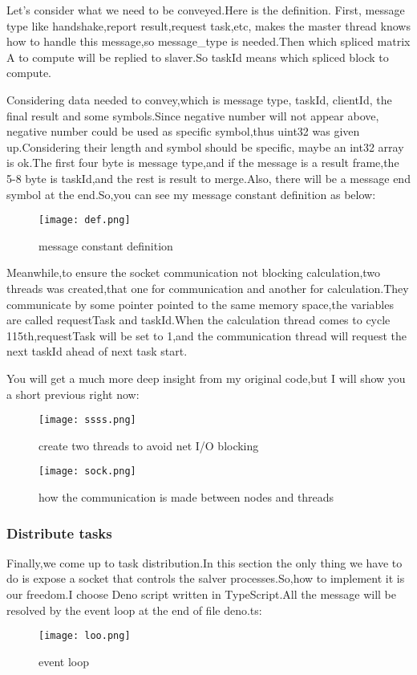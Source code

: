 \documentclass[12pt]{scrartcl} %
\begin{document}
Let's consider what we need to be conveyed.Here is the definition. First, message type like handshake,report result,request task,etc, makes the master thread knows how to handle this message,so message\_type is needed.Then which spliced matrix A to compute will be replied to slaver.So taskId means which spliced block to compute.

Considering data needed to convey,which is message type, taskId, clientId, the final result and some symbols.Since negative number will not appear above, negative number could be used as specific symbol,thus uint32 was given up.Considering their length and symbol should be specific, maybe an int32 array is ok.The first four byte is message type,and if the message is a result frame,the 5-8 byte is taskId,and the rest is result to merge.Also, there will be a message end symbol at the end.So,you can see my message constant definition as below:
\begin{figure}[H]
    \centering
    \texttt{[image: def.png]}
    \caption{message constant definition}
    \label{}
\end{figure}

Meanwhile,to ensure the socket communication not blocking calculation,two threads was created,that one for communication and another for calculation.They communicate by some pointer pointed to the same memory space,the variables are called requestTask and taskId.When the calculation thread comes to cycle 115th,requestTask will be set to 1,and the communication thread will request the next taskId ahead of next task start.

You will get a much more deep insight from my original code,but I will show you a short previous right now:
\begin{figure}[H]
    \centering
    \texttt{[image: ssss.png]}
    \caption{create two threads to avoid net I/O blocking}
    \label{}
\end{figure}
\begin{figure}[H]
    \centering
    \texttt{[image: sock.png]}
    \caption{how the communication is made between nodes and threads}
    \label{}
\end{figure}
\subsubsection{Distribute tasks}
Finally,we come up to task distribution.In this section the only thing we have to do is expose a socket that controls the salver processes.So,how to implement it is our freedom.I choose Deno script written in TypeScript.All the message will be resolved by the event loop at the end of file deno.ts:
\begin{figure}[H]
    \centering
    \texttt{[image: loo.png]}
    \caption{event loop}
    \label{}
\end{figure}
\end{document}
